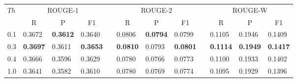 \setlength{\tabcolsep}{5pt}
\begin{tabular*}{\textwidth}{@{\extracolsep{\fill}}llllllllllll} 
\hline \hline
\multirow{2}{*}{$ Th $}	& \multicolumn{3}{c}{ROUGE-1}	&& \multicolumn{3}{c}{ROUGE-2}	&& \multicolumn{3}{c}{ROUGE-W} \\
\cline{2-4} \cline{6-8} \cline{10-12}
	& \multicolumn{1}{c}{R}		& \multicolumn{1}{c}{P}	& \multicolumn{1}{c}{F1}	&& \multicolumn{1}{c}{R}	& \multicolumn{1}{c}{P}	& \multicolumn{1}{c}{F1}	&& \multicolumn{1}{c}{R}	& \multicolumn{1}{c}{P}	& \multicolumn{1}{c}{F1}\\
\hline
0.1		& 0.3672	& \textbf{0.3612}	& 0.3640	&& 0.0806	& \textbf{0.0794}	& 0.0799	&& 0.1105	& 0.1946	& 0.1409 \\
0.3		& \textbf{0.3697}	& 0.3611	& \textbf{0.3653}	&& \textbf{0.0810}	& 0.0793	& \textbf{0.0801}	&& \textbf{0.1114}	& \textbf{0.1949}	& \textbf{0.1417} \\
0.4		& 0.3666	& 0.3596	& 0.3629	&& 0.0780	& 0.0766	& 0.0773	&& 0.1100	& 0.1933	& 0.1402 \\
1.0		& 0.3641	& 0.3582	& 0.3610	&& 0.0780	& 0.0769	& 0.0774	&& 0.1095	& 0.1929	& 0.1396 \\
\hline \hline
\end{tabular*}

